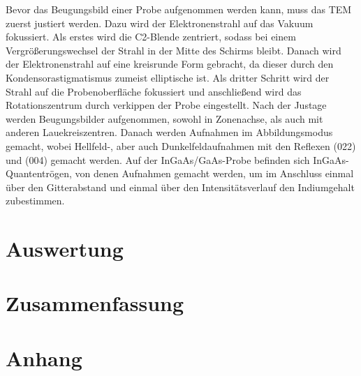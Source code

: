 \documentclass[a4paper,11pt,DIV=11]{scrartcl}
\begin{document}
Bevor das Beugungsbild einer Probe aufgenommen werden kann, muss das TEM zuerst justiert werden. Dazu wird der Elektronenstrahl auf das Vakuum fokussiert. Als erstes wird die C2-Blende zentriert, sodass bei einem Vergrößerungswechsel der Strahl in der Mitte des Schirms bleibt. Danach wird der Elektronenstrahl auf eine kreisrunde Form gebracht, da dieser durch den Kondensorastigmatismus zumeist elliptische ist. Als dritter Schritt wird der Strahl auf die Probenoberfläche fokussiert und anschließend wird das Rotationszentrum durch verkippen der Probe eingestellt. Nach der Justage werden Beugungsbilder aufgenommen, sowohl in Zonenachse, als auch mit anderen Lauekreiszentren. Danach werden Aufnahmen im Abbildungsmodus gemacht, wobei Hellfeld-, aber auch Dunkelfeldaufnahmen mit den Reflexen (022) und (004) gemacht werden. Auf der InGaAs/GaAs-Probe befinden sich InGaAs-Quantentrögen, von denen Aufnahmen gemacht werden, um im Anschluss einmal über den Gitterabstand und einmal über den Intensitätsverlauf den Indiumgehalt zubestimmen.

\section{Auswertung}

\section{Zusammenfassung}

\section*{Anhang}
\end{document}
